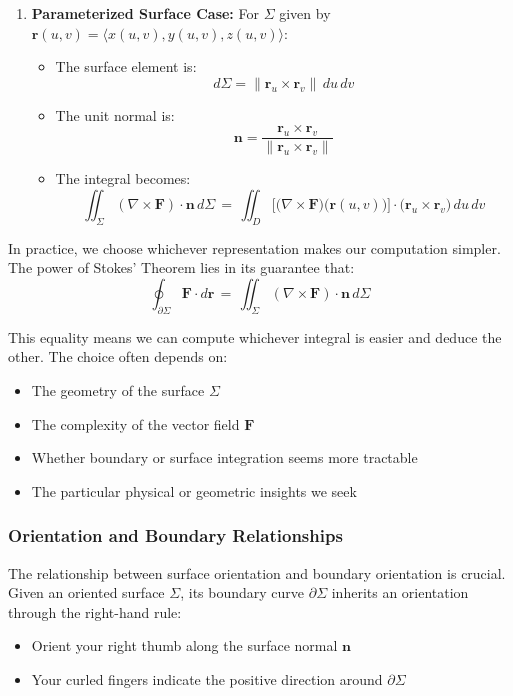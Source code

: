 \begin{enumerate}
    \item \textbf{Parameterized Surface Case:} For $\Sigma$ given by $\mathbf{r}(u,v) = \langle x(u,v), y(u,v), z(u,v) \rangle$:
    \begin{itemize}
        \item The surface element is:
        \[
        d\Sigma = \|\mathbf{r}_u \times \mathbf{r}_v\|\,du\,dv
        \]
        \item The unit normal is:
        \[
        \mathbf{n} = \frac{\mathbf{r}_u \times \mathbf{r}_v}{\|\mathbf{r}_u \times \mathbf{r}_v\|}
        \]
        \item The integral becomes:
        \[
        \iint_{\Sigma} (\nabla \times \mathbf{F}) \cdot \mathbf{n}\,d\Sigma 
        \,=\,
        \iint_{D} 
        \bigl[\bigl(\nabla \times \mathbf{F}\bigr)\bigl(\mathbf{r}(u,v)\bigr)\bigr]\cdot 
        \bigl(\mathbf{r}_u \times \mathbf{r}_v\bigr)\,du\,dv
        \]
    \end{itemize}
\end{enumerate}

\noindent In practice, we choose whichever representation makes our computation simpler. The power of Stokes' Theorem lies in its guarantee that:
\[
\oint_{\partial \Sigma} \mathbf{F}\cdot d\mathbf{r}
\,=\,
\iint_{\Sigma} (\nabla \times \mathbf{F}) \cdot \mathbf{n}\,d\Sigma
\]

\noindent This equality means we can compute whichever integral is easier and deduce the other. The choice often depends on:
\begin{itemize}
    \item The geometry of the surface $\Sigma$
    \item The complexity of the vector field $\mathbf{F}$
    \item Whether boundary or surface integration seems more tractable
    \item The particular physical or geometric insights we seek
\end{itemize}

\subsubsection*{Orientation and Boundary Relationships}

\noindent The relationship between surface orientation and boundary orientation is crucial. Given an oriented surface $\Sigma$, its boundary curve $\partial \Sigma$ inherits an orientation through the right-hand rule:
\begin{itemize}
    \item Orient your right thumb along the surface normal $\mathbf{n}$
    \item Your curled fingers indicate the positive direction around $\partial \Sigma$
\end{itemize}

